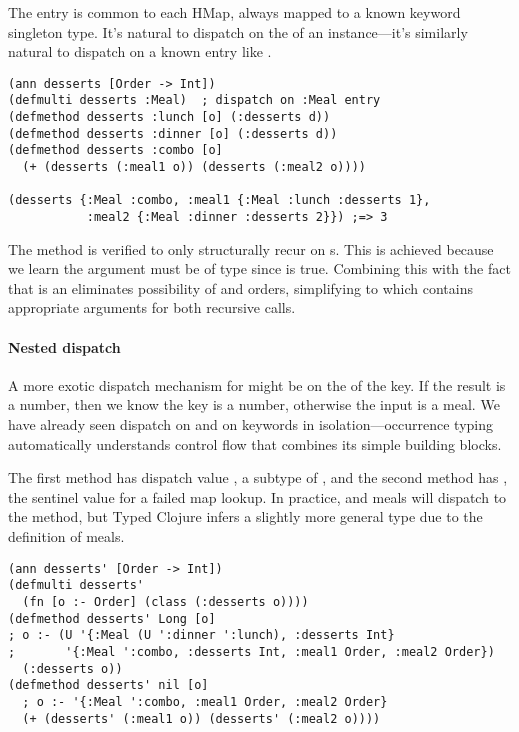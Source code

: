 The  entry is common to each HMap, always mapped to a known keyword singleton
type.
It's natural to dispatch on the  of an instance---it's similarly
natural to dispatch on a known entry like .
%
\begin{exmp}
\begin{verbatim}
(ann desserts [Order -> Int])
(defmulti desserts :Meal)  ; dispatch on :Meal entry
(defmethod desserts :lunch [o] (:desserts d))
(defmethod desserts :dinner [o] (:desserts d))
(defmethod desserts :combo [o] 
  (+ (desserts (:meal1 o)) (desserts (:meal2 o))))

(desserts {:Meal :combo, :meal1 {:Meal :lunch :desserts 1}, 
           :meal2 {:Meal :dinner :desserts 2}}) ;=> 3
\end{verbatim}
\label{example:desserts-on-meal}
\end{exmp}
%
The  method is verified to only structurally recur
on s. This is achieved because we learn the argument  must
be of type
since
is true. Combining this
with the fact that  is an 
eliminates possibility of  and 
orders, simplifying  to
which contains appropriate arguments for both recursive calls.

\paragraph{Nested dispatch}
A more exotic dispatch mechanism for 
might be on the  of the  key.
If the result is a number, then we know the 
key is a number, otherwise the input is a  meal.
We have already seen dispatch on  and on keywords
in isolation---occurrence typing automatically understands
control flow that combines its simple building blocks.

The first method has dispatch value , a subtype
of , and the second method has , the sentinel value for a failed map lookup.
In practice,  and  meals will dispatch to the 
method, but Typed Clojure infers a slightly more general type due to the definition
of  meals.

\begin{exmp}
\begin{verbatim}
(ann desserts' [Order -> Int])
(defmulti desserts' 
  (fn [o :- Order] (class (:desserts o))))
(defmethod desserts' Long [o] 
; o :- (U '{:Meal (U ':dinner ':lunch), :desserts Int}
;       '{:Meal ':combo, :desserts Int, :meal1 Order, :meal2 Order})
  (:desserts o))
(defmethod desserts' nil [o]
  ; o :- '{:Meal ':combo, :meal1 Order, :meal2 Order}
  (+ (desserts' (:meal1 o)) (desserts' (:meal2 o))))
\end{verbatim}
\label{example:desserts-on-class}
\end{exmp}
%

